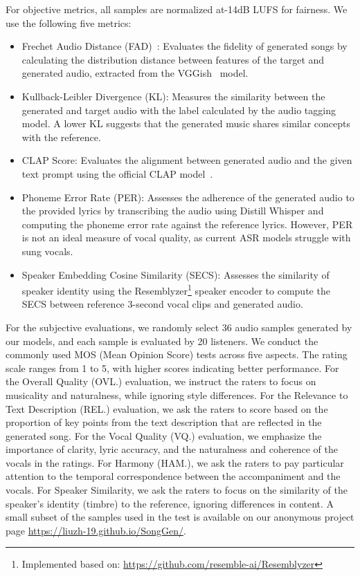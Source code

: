 \label{sec: eval_detail}
For objective metrics, all samples are normalized at-14dB LUFS for fairness. We use the following five metrics:
\begin{itemize}
    \item Frechet Audio Distance (FAD)~\cite{kilgour2019fad}: Evaluates the fidelity of generated songs by calculating the distribution distance between features of the target and generated audio, extracted from the VGGish~\cite{hershey2017vggish} model.
    \item Kullback-Leibler Divergence (KL): Measures the similarity between the generated and target audio with the label calculated by the audio tagging model. A lower KL suggests that the generated music shares similar concepts with the reference.
     \item CLAP Score: Evaluates the alignment between generated audio and the given text prompt using the official CLAP model~\cite{laionclap2023}. 
    \item Phoneme Error Rate (PER): Assesses the adherence of the generated audio to the provided lyrics by transcribing the audio using Distill Whisper\cite{gandhi2023distilwhisper} and computing the phoneme error rate against the reference lyrics. However, PER is not an ideal measure of vocal quality, as current ASR models struggle with sung vocals.
     \item Speaker Embedding Cosine Similarity (SECS): Assesses the similarity of speaker identity using the Resemblyzer\footnote{Implemented based on: \url{https://github.com/resemble-ai/Resemblyzer}} speaker encoder to compute the SECS between reference 3-second vocal clips and generated audio.
   
\end{itemize}
For the subjective evaluations, we randomly select 36 audio samples generated by our models, and each sample is evaluated by 20 listeners. We conduct the commonly used MOS (Mean Opinion Score) tests across five aspects. The rating scale ranges from 1 to 5, with higher scores indicating better performance.
For the Overall Quality (OVL.) evaluation, we instruct the raters to focus on musicality and naturalness, while ignoring style differences.
For the Relevance to Text Description (REL.) evaluation, we ask the raters to score based on the proportion of key points from the text description that are reflected in the generated song.
For the Vocal Quality (VQ.) evaluation, we emphasize the importance of clarity, lyric accuracy, and the naturalness and coherence of the vocals in the ratings.
For Harmony (HAM.), we ask the raters to pay particular attention to the temporal correspondence between the accompaniment and the vocals.
For Speaker Similarity, we ask the raters to focus on the similarity of the speaker's identity (timbre) to the reference, ignoring differences in content.
A small subset of the samples used in the test is available on our anonymous project page \url{https://liuzh-19.github.io/SongGen/}.

